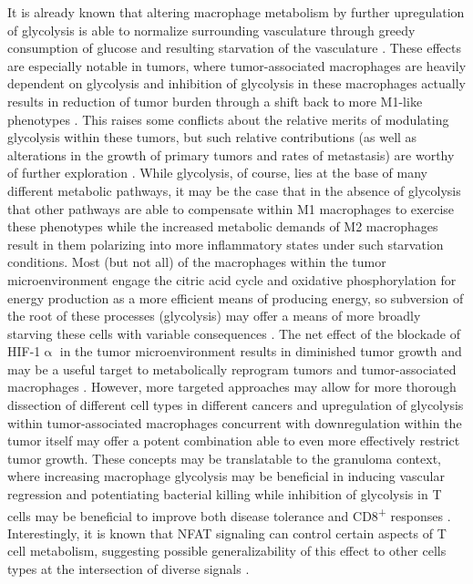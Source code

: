 It is already known that altering macrophage metabolism by further upregulation of glycolysis is able to normalize surrounding vasculature through greedy consumption of glucose and resulting starvation of the vasculature \citep{Wenes2016}. These effects are especially notable in tumors, where tumor\hyp{}associated macrophages are heavily dependent on glycolysis and inhibition of glycolysis in these macrophages actually results in reduction of tumor burden through a shift back to more M1\hyp{}like phenotypes \citep{Mehla2019, Rabold2017}. This raises some conflicts about the relative merits of modulating glycolysis within these tumors, but such relative contributions (as well as alterations in the growth of primary tumors and rates of metastasis) are worthy of further exploration \citep{Mojsilovic2021}. While glycolysis, of course, lies at the base of many different metabolic pathways, it may be the case that in the absence of glycolysis that other pathways are able to compensate within M1 macrophages to exercise these phenotypes while the increased metabolic demands of M2 macrophages result in them polarizing into more inflammatory states under such starvation conditions. Most (but not all) of the macrophages within the tumor microenvironment engage the citric acid cycle and oxidative phosphorylation for energy production as a more efficient means of producing energy, so subversion of the root of these processes (glycolysis) may offer a means of more broadly starving these cells with variable consequences \citep{Geeraerts2021, Yu2020, Puthenveetil2020}. The net effect of the blockade of HIF\hyp{}1$\upalpha$ in the tumor microenvironment results in diminished tumor growth and may be a useful target to metabolically reprogram tumors and tumor\hyp{}associated macrophages \citep{Hong2004}. However, more targeted approaches may allow for more thorough dissection of different cell types in different cancers and upregulation of glycolysis within tumor\hyp{}associated macrophages concurrent with downregulation within the tumor itself may offer a potent combination able to even more effectively restrict tumor growth. These concepts may be translatable to the granuloma context, where increasing macrophage glycolysis may be beneficial in inducing vascular regression and potentiating bacterial killing while inhibition of glycolysis in T cells may be beneficial to improve both disease tolerance and CD8\textsuperscript{+} responses \citep{Phan2017, Russell2019b, Tzelepis2018, Wik2022}. Interestingly, it is known that NFAT signaling can control certain aspects of T cell metabolism, suggesting possible generalizability of this effect to other cells types at the intersection of diverse signals \citep{Vaeth2018}.

